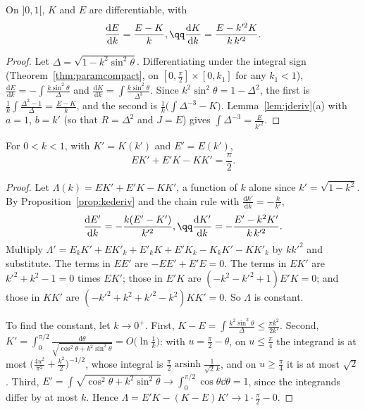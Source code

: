 \begin{proposition}\label{prop:kederiv}
On $]0,1[$, $K$ and $E$ are differentiable, with
\[
\begin{gathered}\frac{\mathrm dE}{\mathrm dk}=\frac{E-K}k,\qq\frac{\mathrm dK}{\mathrm dk}=\frac{E-k'^2K}{k\,k'^2}.\end{gathered}
\]
\end{proposition}
\begin{proof}
Let $\Delta=\sqrt{1-k^2\sin^2\theta}$. Differentiating under the integral sign (Theorem~\ref{thm:paramcompact}, on $[0,\frac\pi2]\times[0,k_1]$ for any $k_1<1$),
$\frac{\mathrm dE}{\mathrm dk}=-\int\frac{k\sin^2\theta}\Delta$ and $\frac{\mathrm dK}{\mathrm dk}=\int\frac{k\sin^2\theta}{\Delta^3}$. Since $k^2\sin^2\theta=1-\Delta^2$, the first is
$\frac1k\int\frac{\Delta^2-1}\Delta=\frac{E-K}k$, and the second is $\frac1k\bigl(\int\Delta^{-3}-K\bigr)$. Lemma~\ref{lem:jderiv}(a) with $a=1$, $b=k'$ (so that $R=\Delta^2$ and
$J=E$) gives $\int\Delta^{-3}=\frac E{k'^2}$.
\end{proof}

\begin{theorem}\label{thm:legendre}
For $0<k<1$, with $K'=K(k')$ and $E'=E(k')$,
\[
EK'+E'K-KK'=\frac\pi2.
\]
\end{theorem}
\begin{proof}
Let $\Lambda(k)=EK'+E'K-KK'$, a function of $k$ alone since $k'=\sqrt{1-k^2}$. By Proposition~\ref{prop:kederiv} and the chain rule with $\frac{\mathrm dk'}{\mathrm dk}=-\frac k{k'}$,
\[
\begin{gathered}\frac{\mathrm dE'}{\mathrm dk}=-\frac{k(E'-K')}{k'^2},\qq\frac{\mathrm dK'}{\mathrm dk}=-\frac{E'-k^2K'}{k\,k'^2}.\end{gathered}
\]
Multiply $\Lambda'=E_kK'+EK'_k+E'_kK+E'K_k-K_kK'-KK'_k$ by $kk'^2$ and substitute. The terms in $EE'$ are $-EE'+E'E=0$. The terms in $EK'$ are
$k'^2+k^2-1=0$ times $EK'$; those in $E'K$ are $(-k^2-k'^2+1)E'K=0$; and those in $KK'$ are $(-k'^2+k^2+k'^2-k^2)KK'=0$. So $\Lambda$ is constant.

To find the constant, let $k\to0^+$. First, $K-E=\int\frac{k^2\sin^2\theta}\Delta\le\frac{\pi k^2}{2k'}$. Second, $K'=\int_0^{\pi/2}\frac{\mathrm d\theta}{\sqrt{\cos^2\theta+k^2\sin^2\theta}}=O\bigl(\ln\frac1k\bigr)$:
with $u=\frac\pi2-\theta$, on $u\le\frac\pi4$ the integrand is at most $\bigl(\frac{4u^2}{\pi^2}+\frac{k^2}2\bigr)^{-1/2}$, whose integral is $\frac\pi2\operatorname{arsinh}\frac1{\sqrt2\,k}$, and on $u\ge\frac\pi4$
it is at most $\sqrt2$. Third, $E'=\int\sqrt{\cos^2\theta+k^2\sin^2\theta}\to\int_0^{\pi/2}\cos\theta\dd\theta=1$, since the integrands differ by at most $k$. Hence
$\Lambda=E'K-(K-E)K'\to1\cdot\frac\pi2-0$.
\end{proof}

